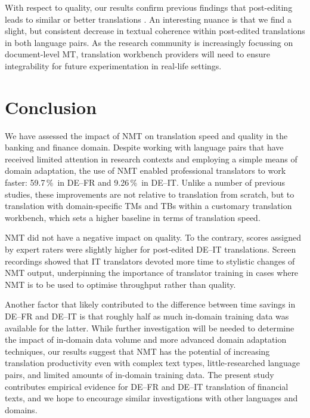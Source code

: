 \documentclass[11pt]{article}
\newcommand{\eg}{e.\,g.,\ }
\newcommand{\percent}{\,\%\ }
\begin{document}
With respect to quality, our results confirm previous findings that post-editing leads to similar or better translations \citep[\eg][]{Green2013}. An interesting nuance is that we find a slight, but consistent decrease in textual coherence within post-edited translations in both language pairs. As the research community is increasingly focussing on document-level MT, translation workbench providers will need to ensure integrability for future experimentation in real-life settings.

\section{Conclusion}
\label{sec:Conclusion}

We have assessed the impact of NMT on translation speed and quality in the banking and finance domain. Despite working with language pairs that have received limited attention in research contexts and employing a simple means of domain adaptation, the use of NMT enabled professional translators to work faster: 59.7\percent in DE--FR and 9.26\percent in DE--IT. Unlike a number of previous studies, these improvements are not relative to translation from scratch, but to translation with domain-specific TMs and TBs within a customary translation workbench, which sets a higher baseline in terms of translation speed.

NMT did not have a negative impact on quality. To the contrary, scores assigned by expert raters were slightly higher for post-edited DE--IT translations. Screen recordings showed that IT translators devoted more time to stylistic changes of NMT output, underpinning the importance of translator training in cases where NMT is to be used to optimise throughput rather than quality.

Another factor that likely contributed to the difference between time savings in DE--FR and DE--IT is that roughly half as much in-domain training data was available for the latter. While further investigation will be needed to determine the impact of in-domain data volume and more advanced domain adaptation techniques, our results suggest that NMT has the potential of increasing translation productivity even with complex text types, little-researched language pairs, and limited amounts of in-domain training data. The present study contributes empirical evidence for DE--FR and DE--IT translation of financial texts, and we hope to encourage similar investigations with other languages and domains.
\end{document}
